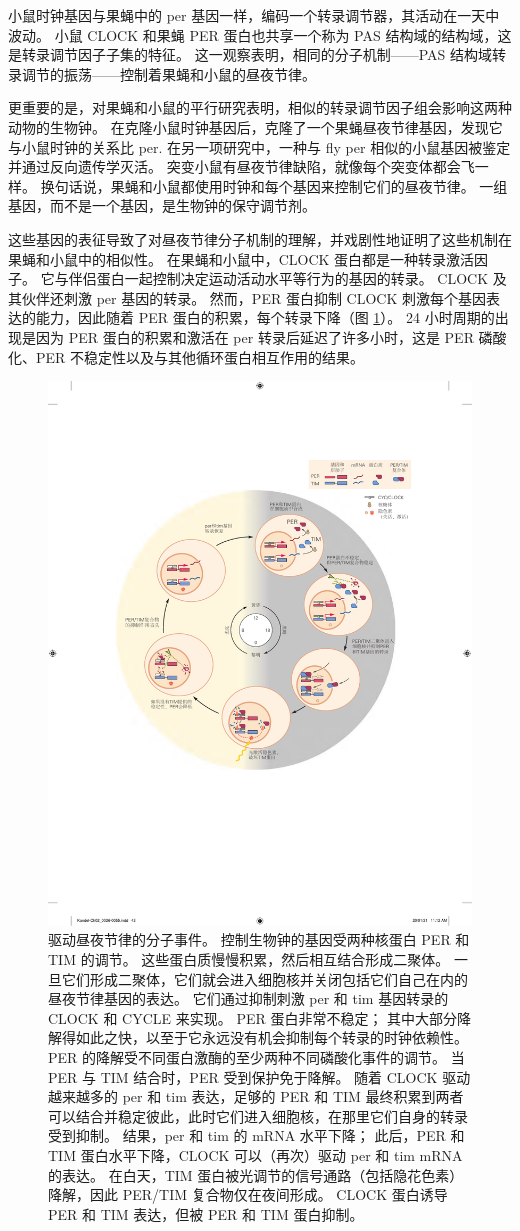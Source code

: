 小鼠时钟基因与果蝇中的 per 基因一样，编码一个转录调节器，其活动在一天中波动。 
小鼠 CLOCK 和果蝇 PER 蛋白也共享一个称为 PAS 结构域的结构域，这是转录调节因子子集的特征。 
这一观察表明，相同的分子机制——PAS 结构域转录调节的振荡——控制着果蝇和小鼠的昼夜节律。


更重要的是，对果蝇和小鼠的平行研究表明，相似的转录调节因子组会影响这两种动物的生物钟。 
在克隆小鼠时钟基因后，克隆了一个果蝇昼夜节律基因，发现它与小鼠时钟的关系比 per. 在另一项研究中，一种与 fly per 相似的小鼠基因被鉴定并通过反向遗传学灭活。 
突变小鼠有昼夜节律缺陷，就像每个突变体都会飞一样。 
换句话说，果蝇和小鼠都使用时钟和每个基因来控制它们的昼夜节律。 
一组基因，而不是一个基因，是生物钟的保守调节剂。


这些基因的表征导致了对昼夜节律分子机制的理解，并戏剧性地证明了这些机制在果蝇和小鼠中的相似性。 
在果蝇和小鼠中，CLOCK 蛋白都是一种转录激活因子。 
它与伴侣蛋白一起控制决定运动活动水平等行为的基因的转录。 
CLOCK 及其伙伴还刺激 per 基因的转录。 
然而，PER 蛋白抑制 CLOCK 刺激每个基因表达的能力，因此随着 PER 蛋白的积累，每个转录下降（图 \ref{fig:2_13}）。 
24 小时周期的出现是因为 PER 蛋白的积累和激活在 per 转录后延迟了许多小时，这是 PER 磷酸化、PER 不稳定性以及与其他循环蛋白相互作用的结果。

\begin{figure}[htbp]
	\centering
	\includegraphics[width=0.5\linewidth]{chap02/fig_2_13}
	\caption{驱动昼夜节律的分子事件。 
		控制生物钟的基因受两种核蛋白 PER 和 TIM 的调节。 
		这些蛋白质慢慢积累，然后相互结合形成二聚体。 
		一旦它们形成二聚体，它们就会进入细胞核并关闭包括它们自己在内的昼夜节律基因的表达。 
		它们通过抑制刺激 per 和 tim 基因转录的 CLOCK 和 CYCLE 来实现。 
		PER 蛋白非常不稳定； 其中大部分降解得如此之快，以至于它永远没有机会抑制每个转录的时钟依赖性。 
		PER 的降解受不同蛋白激酶的至少两种不同磷酸化事件的调节。 
		当 PER 与 TIM 结合时，PER 受到保护免于降解。 
		随着 CLOCK 驱动越来越多的 per 和 tim 表达，足够的 PER 和 TIM 最终积累到两者可以结合并稳定彼此，此时它们进入细胞核，在那里它们自身的转录受到抑制。 
		结果，per 和 tim 的 mRNA 水平下降； 此后，PER 和 TIM 蛋白水平下降，CLOCK 可以（再次）驱动 per 和 tim mRNA 的表达。 
		在白天，TIM 蛋白被光调节的信号通路（包括隐花色素）降解，因此 PER/TIM 复合物仅在夜间形成。 
		CLOCK 蛋白诱导 PER 和 TIM 表达，但被 PER 和 TIM 蛋白抑制。}
	\label{fig:2_13}
\end{figure}


